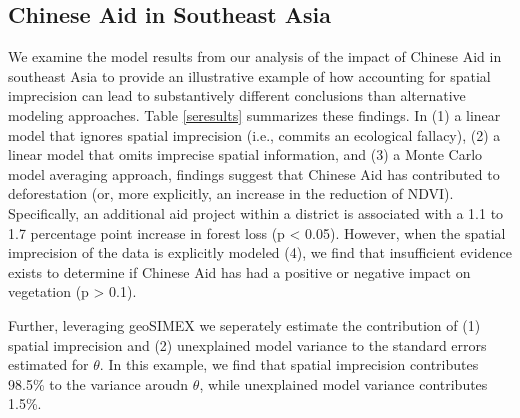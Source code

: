 \subsection{Chinese Aid in Southeast Asia}
We examine the model results from our analysis of the impact of Chinese Aid in southeast Asia to provide an illustrative example of how accounting for spatial imprecision can lead to substantively different conclusions than alternative modeling approaches.
Table \ref{seresults} summarizes these findings.
In (1) a linear model that ignores spatial imprecision (i.e., commits an ecological fallacy), (2) a linear model that omits imprecise spatial information, and (3) a Monte Carlo model averaging approach, findings suggest that Chinese Aid has contributed to deforestation (or, more explicitly, an increase in the reduction of NDVI). Specifically, an additional aid project within a district is associated with a 1.1 to 1.7 percentage point increase in forest loss (p < 0.05).
However, when the spatial imprecision of the data is explicitly modeled (4), we find that insufficient evidence exists to determine if Chinese Aid has had a positive or negative impact on vegetation (p > 0.1).
\par
Further, leveraging geoSIMEX we seperately estimate the contribution of (1) spatial imprecision and (2) unexplained model variance to the standard errors estimated for $\theta$.
In this example, we find that spatial imprecision contributes 98.5\% to the variance aroudn $\theta$, while unexplained model variance contributes 1.5\%.

\newpage

